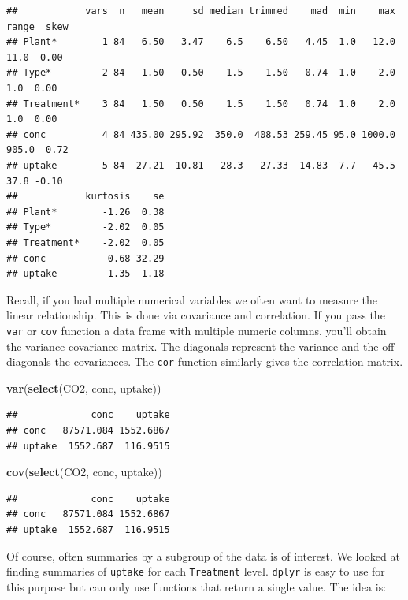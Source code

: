\documentclass[
]{book}
\newenvironment{Shaded}{\begin{snugshade}}{\end{snugshade}}
\newcommand{\KeywordTok}[1]{\textcolor[rgb]{0.13,0.29,0.53}{\textbf{#1}}}
\newcommand{\NormalTok}[1]{#1}
\theoremstyle{definition}
\theoremstyle{definition}
\theoremstyle{definition}
\theoremstyle{remark}
\begin{document}
\begin{verbatim}
##            vars  n   mean     sd median trimmed    mad  min    max range  skew
## Plant*        1 84   6.50   3.47    6.5    6.50   4.45  1.0   12.0  11.0  0.00
## Type*         2 84   1.50   0.50    1.5    1.50   0.74  1.0    2.0   1.0  0.00
## Treatment*    3 84   1.50   0.50    1.5    1.50   0.74  1.0    2.0   1.0  0.00
## conc          4 84 435.00 295.92  350.0  408.53 259.45 95.0 1000.0 905.0  0.72
## uptake        5 84  27.21  10.81   28.3   27.33  14.83  7.7   45.5  37.8 -0.10
##            kurtosis    se
## Plant*        -1.26  0.38
## Type*         -2.02  0.05
## Treatment*    -2.02  0.05
## conc          -0.68 32.29
## uptake        -1.35  1.18
\end{verbatim}

Recall, if you had multiple numerical variables we often want to measure the linear relationship. This is done via covariance and correlation. If you pass the \texttt{var} or \texttt{cov} function a data frame with multiple numeric columns, you'll obtain the variance-covariance matrix. The diagonals represent the variance and the off-diagonals the covariances. The \texttt{cor} function similarly gives the correlation matrix.

\begin{Shaded}
\begin{Highlighting}[]
\KeywordTok{var}\NormalTok{(}\KeywordTok{select}\NormalTok{(CO2, conc, uptake))}
\end{Highlighting}
\end{Shaded}

\begin{verbatim}
##             conc    uptake
## conc   87571.084 1552.6867
## uptake  1552.687  116.9515
\end{verbatim}

\begin{Shaded}
\begin{Highlighting}[]
\KeywordTok{cov}\NormalTok{(}\KeywordTok{select}\NormalTok{(CO2, conc, uptake))}
\end{Highlighting}
\end{Shaded}

\begin{verbatim}
##             conc    uptake
## conc   87571.084 1552.6867
## uptake  1552.687  116.9515
\end{verbatim}

Of course, often summaries by a subgroup of the data is of interest. We looked at finding summaries of \texttt{uptake} for each \texttt{Treatment} level. \texttt{dplyr} is easy to use for this purpose but can only use functions that return a single value. The idea is:
\end{document}
